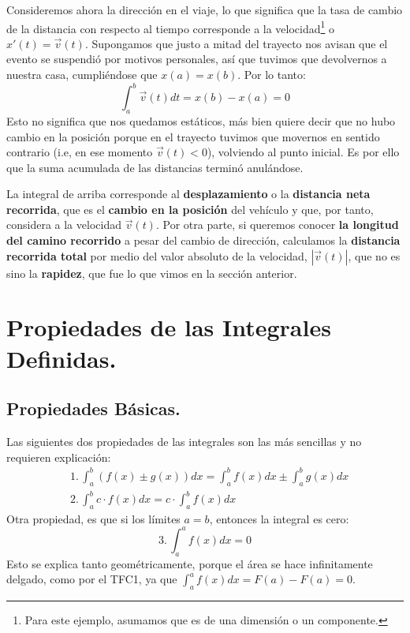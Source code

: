 \documentclass[12pt]{article}
\begin{document}
Consideremos ahora la dirección en el viaje, lo que significa que la tasa de cambio de la distancia con respecto al tiempo corresponde a la velocidad\footnote{Para este ejemplo, asumamos que es de una dimensión o un componente.} o $x'(t) = \vec{v}(t)$. Supongamos que justo a mitad del trayecto nos avisan que el evento se suspendió por motivos personales, así que tuvimos que devolvernos a nuestra casa, cumpliéndose que $x(a) = x(b)$. Por lo tanto:
\[
  \int_{a}^{b} \vec{v}(t) dt = x(b) - x(a) = 0
\]
Esto no significa que nos quedamos estáticos, más bien quiere decir que no hubo cambio en la posición porque en el trayecto tuvimos que movernos en sentido contrario (i.e, en ese momento $\vec{v}(t) < 0$), volviendo al punto inicial. Es por ello que la suma acumulada de las distancias terminó anulándose.

La integral de arriba corresponde al \textbf{desplazamiento} o la \textbf{distancia neta recorrida}, que es el \textbf{cambio en la posición} del vehículo y que, por tanto, considera a la velocidad $\vec{v}(t)$. Por otra parte, si queremos conocer \textbf{la longitud del camino recorrido} a pesar del cambio de dirección, calculamos la \textbf{distancia recorrida total} por medio del valor absoluto de la velocidad, $|\vec{v}(t)|$, que no es sino la \textbf{rapidez}, que fue lo que vimos en la sección anterior.

\section{Propiedades de las Integrales Definidas.}

\subsection{Propiedades Básicas.}

Las siguientes dos propiedades de las integrales son las más sencillas y no requieren explicación:
\begin{align*}
&1. \, \int_{a}^{b} (f(x) \pm g(x))dx = \int_{a}^{b} f(x)dx \pm \int_{a}^{b} g(x)dx \\
&2. \, \int_{a}^{b} c \cdot f(x)dx = c \cdot \int_{a}^{b} f(x)dx 
\end{align*}
Otra propiedad, es que si los límites $a = b$, entonces la integral es cero:
\[
3. \, \int_{a}^{a} f(x)dx = 0
\]
Esto se explica tanto geométricamente, porque el área se hace infinitamente delgado, como por el TFC1, ya que $\int_{a}^{a} f(x)dx = F(a) - F(a) = 0$.
\end{document}
